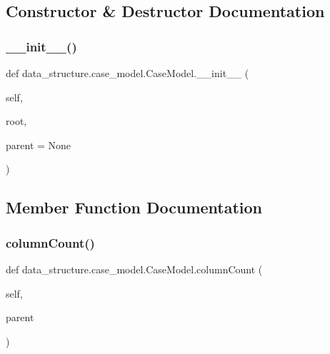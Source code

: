 \subsection{Constructor \& Destructor Documentation}
\hypertarget{classdata__structure_1_1case__model_1_1_case_model_a7961b552537902b9236c2ded9cbfbc63}{}\label{classdata__structure_1_1case__model_1_1_case_model_a7961b552537902b9236c2ded9cbfbc63} 
\subsubsection{\texorpdfstring{\+\_\+\+\_\+init\+\_\+\+\_\+()}{\_\_init\_\_()}}
{\footnotesize\ttfamily def data\+\_\+structure.\+case\+\_\+model.\+Case\+Model.\+\_\+\+\_\+init\+\_\+\+\_\+ (\begin{DoxyParamCaption}\item[{}]{self,  }\item[{}]{root,  }\item[{}]{parent = {\ttfamily None} }\end{DoxyParamCaption})}



\subsection{Member Function Documentation}
\hypertarget{classdata__structure_1_1case__model_1_1_case_model_a132b1b7d95f07cae505b40b7fdeb4545}{}\label{classdata__structure_1_1case__model_1_1_case_model_a132b1b7d95f07cae505b40b7fdeb4545} 
\subsubsection{\texorpdfstring{column\+Count()}{columnCount()}}
{\footnotesize\ttfamily def data\+\_\+structure.\+case\+\_\+model.\+Case\+Model.\+column\+Count (\begin{DoxyParamCaption}\item[{}]{self,  }\item[{}]{parent }\end{DoxyParamCaption})}

